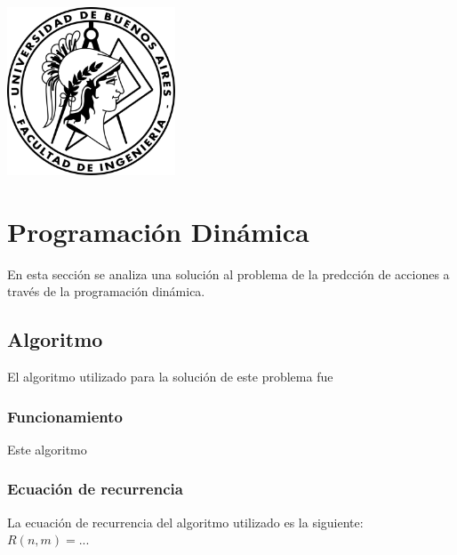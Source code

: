 \documentclass[a4paper, 10pt]{article}
\newcommand\tab[1][0.5cm]{\hspace*{#1}}
\begin{document}
    \newpage

    \begin{center}
        \includegraphics[width=5cm, height=5cm]{images/logo}
    \end{center}


    \maketitle
    \newpage
    \tableofcontents
    \newpage

    \section{Programación Dinámica}
        \tab En esta sección se analiza una solución al problema de la predcción de acciones a través
        de la programación dinámica.
        \subsection{Algoritmo}
            \tab El algoritmo utilizado para la solución de este problema fue %
            \subsubsection{Funcionamiento}
                \tab Este algoritmo %
            \subsubsection{Ecuación de recurrencia}
                \tab La ecuación de recurrencia del algoritmo utilizado es la siguiente: \\
                \tab\tab\tab $ R(n, m) = ... $ %
    \newpage
\end{document}
